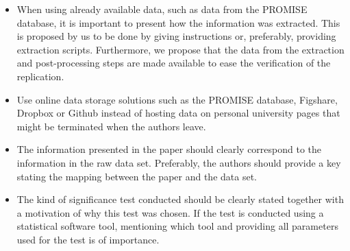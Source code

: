 \begin{itemize}


\item When using already available data, such as data from the PROMISE database, it is important to present how the information was extracted. This is proposed by us to be done by giving instructions or, preferably, providing extraction scripts. Furthermore, we propose that the data from the extraction and post-processing steps are made available to ease the verification of the replication.


\item Use online data storage solutions such as the PROMISE database, Figshare, Dropbox or Github instead of hosting data on personal university pages that might be terminated when the authors leave.


\item The information presented in the paper should clearly correspond to the information in the raw data set. Preferably, the authors should provide a key stating the mapping between the paper and the data set.


\item The kind of significance test conducted should be clearly stated together with a motivation of why this test was chosen. If the test is conducted using a statistical software tool, mentioning which tool and providing all parameters used for the test is of importance. 


\end{itemize}
